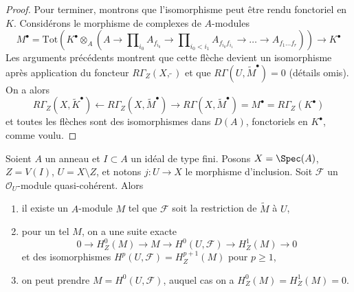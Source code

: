 \begin{proof}
\medskip\noindent
Pour terminer, montrons que l'isomorphisme peut être rendu fonctoriel en $K$. Considérons le morphisme de complexes de $A$-modules
$$
M^\bullet = \text{Tot}\left(
K^\bullet \otimes_A
(A \to \prod\nolimits_{i_0} A_{f_{i_0}} \to
\prod\nolimits_{i_0 < i_1} A_{f_{i_0}f_{i_1}} \to
\ldots \to A_{f_1\ldots f_r})\right)
\longrightarrow
K^\bullet
$$
Les arguments précédents montrent que cette flèche devient un isomorphisme après application du foncteur $R\Gamma_Z(X, \widetilde{\ })$ et que $R\Gamma(U, \widetilde{M}^\bullet) = 0$ (détails omis). On a alors
$$
R\Gamma_Z(X, \widetilde{K}^\bullet)
\leftarrow
R\Gamma_Z(X, \widetilde{M}^\bullet)
\rightarrow
R\Gamma(X, \widetilde{M}^\bullet) = M^\bullet = R\Gamma_Z(K^\bullet)
$$
et toutes les flèches sont des isomorphismes dans $D(A)$, fonctoriels en $K^\bullet$, comme voulu.
\end{proof}

\begin{lemma}
\label{lemma-local-cohomology}
Soient $A$ un anneau et $I \subset A$ un idéal de type fini. Posons $X = \Spec(A)$, $Z = V(I)$, $U = X \setminus Z$, et notons $j : U \to X$ le morphisme d'inclusion. Soit $\mathcal{F}$ un $\mathcal{O}_U$-module quasi-cohérent. Alors
\begin{enumerate}
\item il existe un $A$-module $M$ tel que $\mathcal{F}$ soit la restriction de $\widetilde{M}$ à $U$,
\item pour un tel $M$, on a une suite exacte
$$
0 \to H^0_Z(M) \to M \to H^0(U, \mathcal{F}) \to H^1_Z(M) \to 0
$$
et des isomorphismes $H^p(U, \mathcal{F}) = H^{p + 1}_Z(M)$ pour $p \geq 1$,
\item on peut prendre $M = H^0(U, \mathcal{F})$, auquel cas on a $H^0_Z(M) = H^1_Z(M) = 0$.
\end{enumerate}
\end{lemma}

